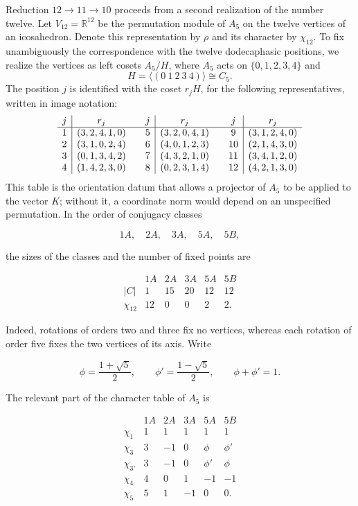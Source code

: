 Reduction \(12\to11\to10\) proceeds from a second realization of the number
twelve. Let \(V_{12}=\mathbb R^{12}\) be the permutation module of \(A_5\) on
the twelve vertices of an icosahedron. Denote this representation by \(\rho\)
and its character by \(\chi_{12}\). To fix unambiguously the correspondence
with the twelve dodecaphasic positions, we realize the vertices as left
cosets \(A_5/H\), where \(A_5\) acts on \(\{0,1,2,3,4\}\) and
\[
 H=\langle(0\ 1\ 2\ 3\ 4)\rangle\cong C_5.
\]
The position \(j\) is identified with the coset \(r_jH\), for the
following representatives, written in image notation:
\[
\begin{array}{c|c@{\qquad}c|c@{\qquad}c|c}
j&r_j&j&r_j&j&r_j\\ \hline
1&(3,2,4,1,0)&5&(3,2,0,4,1)&9&(3,1,2,4,0)\\
2&(3,1,0,2,4)&6&(4,0,1,2,3)&10&(2,1,4,3,0)\\
3&(0,1,3,4,2)&7&(4,3,2,1,0)&11&(3,4,1,2,0)\\
4&(1,4,2,3,0)&8&(0,2,3,1,4)&12&(4,2,1,3,0)
\end{array}
\]
This table is the orientation datum that allows a projector of
\(A_5\) to be applied to the vector \(K\); without it, a coordinate norm would depend on an
unspecified permutation. In the order of conjugacy classes

\[
1A,\quad2A,\quad3A,\quad5A,\quad5B,
\]

the sizes of the classes and the number of fixed points are

\[
\begin{array}{c|rrrrr}
 &1A&2A&3A&5A&5B\\ \hline
|C|&1&15&20&12&12\\
\chi_{12}&12&0&0&2&2.
\end{array}
\]

Indeed, rotations of orders two and three fix no vertices, whereas
each rotation of order five fixes the two vertices of its axis. Write

\[
\phi=\frac{1+\sqrt5}{2},
\qquad
\phi'=\frac{1-\sqrt5}{2},
\qquad
\phi+\phi'=1.
\]

The relevant part of the character table of \(A_5\) is

\[
\begin{array}{c|rrrrr}
 &1A&2A&3A&5A&5B\\ \hline
\chi_1&1&1&1&1&1\\
\chi_3&3&-1&0&\phi&\phi'\\
\chi_{3'}&3&-1&0&\phi'&\phi\\
\chi_4&4&0&1&-1&-1\\
\chi_5&5&1&-1&0&0.
\end{array}
\]

